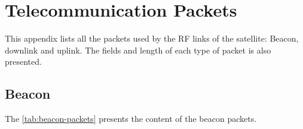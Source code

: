 %
%
%
%
%

%
%
%
%
%
%

\chapter{Telecommunication Packets} \label{anx:packets}

This appendix lists all the packets used by the RF links of the satellite: Beacon, downlink and uplink. The fields and length of each type of packet is also presented.

\section{Beacon}

The \autoref{tab:beacon-packets} presents the content of the beacon packets.

